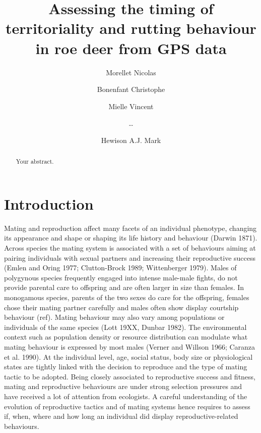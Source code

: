 \documentclass[a4paper,11pt]{article}
\title{Assessing the timing of territoriality and rutting behaviour in roe deer from GPS data}
\author{Morellet Nicolas \and Bonenfant Christophe \and Mielle Vincent \and \ldots \and Hewison A.J. Mark}
\begin{document}
\maketitle

\begin{abstract}
Your abstract.
\end{abstract}

\newpage
\section{Introduction}

Mating and reproduction affect many facets of an individual phenotype, changing its appearance and shape or shaping its life history and behaviour (Darwin 1871).  Across species the mating system is associated with a set of behaviours aiming at pairing individuals with sexual partners and increasing their reproductive success (Emlen and Oring 1977; Clutton-Brock 1989; Wittenberger 1979). Males of polygynous species frequently engaged into intense male-male fights, do not provide parental care to offspring and are often larger in size than females. In monogamous species, parents of the two sexes do care for the offspring, females chose their mating partner carefully and males often show display courtship behaviour (ref). Mating behaviour may also vary among populations or individuals of the same species (Lott 19XX, Dunbar 1982). The environmental context such as population density or resource distribution can modulate what mating behaviour is expressed by most males (Verner and Willson 1966; Caranza et al. 1990). At the individual level, age, social status, body size or physiological states are tightly linked with the decision to reproduce and the type of mating tactic to be adopted. Being closely associated to reproductive success and fitness, mating and reproductive behaviours are under strong selection pressures and have received a lot of attention from ecologists. A careful understanding of the evolution of reproductive tactics and of mating systems hence requires to assess if, when, where and how long an individual did display reproductive-related behaviours.
\end{document}

